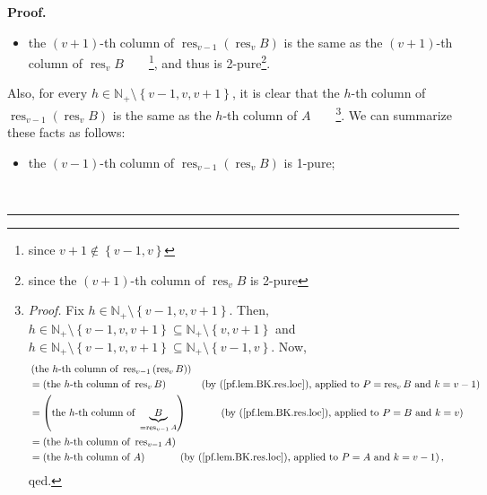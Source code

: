 \documentclass[numbers=enddot,12pt,final,onecolumn,notitlepage]{scrartcl}%
\theoremstyle{definition}
\newenvironment{proof}[1][Proof]{\noindent\textbf{#1.} }{\ \rule{0.5em}{0.5em}}
\newenvironment{verlong}{}{}
\begin{document}
\begin{verlong}
\begin{proof}
\begin{itemize}
\item the $\left(  v+1\right)  $-th column of $\operatorname*{res}%
\nolimits_{v-1}\left(  \operatorname*{res}\nolimits_{v}B\right)  $ is the same
as the $\left(  v+1\right)  $-th column of $\operatorname*{res}\nolimits_{v}%
B$\ \ \ \ \footnote{since $v+1\notin\left\{  v-1,v\right\}  $}, and thus is
2-pure\footnote{since the $\left(  v+1\right)  $-th column of
$\operatorname*{res}\nolimits_{v}B$ is 2-pure}.
\end{itemize}

Also, for every $h\in\mathbb{N}_{+}\setminus\left\{  v-1,v,v+1\right\}  $, it
is clear that the $h$-th column of $\operatorname*{res}\nolimits_{v-1}\left(
\operatorname*{res}\nolimits_{v}B\right)  $ is the same as the $h$-th column
of $A$\ \ \ \ \footnote{\textit{Proof.} Fix $h\in\mathbb{N}_{+}\setminus
\left\{  v-1,v,v+1\right\}  $. Then, $h\in\mathbb{N}_{+}\setminus\left\{
v-1,v,v+1\right\}  \subseteq\mathbb{N}_{+}\setminus\left\{  v,v+1\right\}  $
and $h\in\mathbb{N}_{+}\setminus\left\{  v-1,v,v+1\right\}  \subseteq
\mathbb{N}_{+}\setminus\left\{  v-1,v\right\}  $. Now,%
\begin{align*}
&  \left(  \text{the }h\text{-th column of }\operatorname*{res}\nolimits_{v-1}%
\left(  \operatorname*{res}\nolimits_{v}B\right)  \right) \\
&  =\left(  \text{the }h\text{-th column of }\operatorname*{res}%
\nolimits_{v}B\right)  \ \ \ \ \ \ \ \ \ \ \left(  \text{by
(\ref{pf.lem.BK.res.loc}), applied to }P=\operatorname*{res}\nolimits_{v}%
B\text{ and }k=v-1\right) \\
&  =\left(  \text{the }h\text{-th column of }\underbrace{B}%
_{=\operatorname*{res}\nolimits_{v-1}A}\right)  \ \ \ \ \ \ \ \ \ \ \left(
\text{by (\ref{pf.lem.BK.res.loc}), applied to }P=B\text{ and }k=v\right) \\
&  =\left(  \text{the }h\text{-th column of }\operatorname*{res}%
\nolimits_{v-1}A\right) \\
&  =\left(  \text{the }h\text{-th column of }A\right)
\ \ \ \ \ \ \ \ \ \ \left(  \text{by (\ref{pf.lem.BK.res.loc}), applied to
}P=A\text{ and }k=v-1\right)  ,
\end{align*}
qed.}. We can summarize these facts as follows:

\begin{itemize}
\item the $\left(  v-1\right)  $-th column of $\operatorname*{res}%
\nolimits_{v-1}\left(  \operatorname*{res}\nolimits_{v}B\right)  $ is 1-pure;


\end{itemize}
\end{proof}
\end{verlong}
\end{document}
